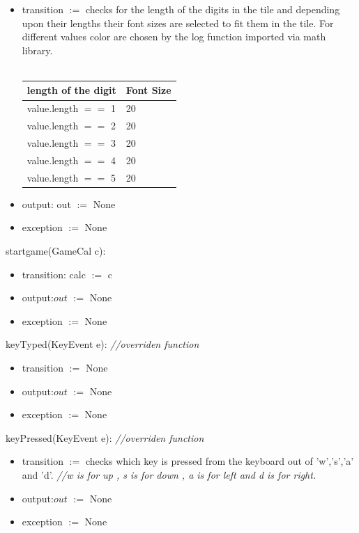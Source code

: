 \documentclass[12pt]{article}
\begin{document}
\begin{itemize}
  \item transition $:=$ checks for the length of the digits in the tile and depending upon their lengths their font sizes are selected to fit them in the tile. For different values color are chosen by the log function imported via math library.\\\\
  \medskip
  \begin{tabular}{| l | l |}
  \hline
  \textbf{length of the digit} & Font Size \\
  \hline
  value.length $==$ 1 &  20 \\
  \hline
  value.length $==$ 2 &  20 \\
  \hline
  value.length $==$ 3 & 20 \\
  \hline
  value.length $==$ 4 & 20 \\
  \hline
  value.length $==$ 5 & 20 \\
  \hline
  \end{tabular}
    \item output: out $:=$ None
  \item exception $:=$ None
\end{itemize}

\noindent startgame(GameCal c):
\begin{itemize}
\item transition: calc $:=$ c
  \item output:$out$ $:=$ None
  \item exception $:=$ None
\end{itemize}

\noindent keyTyped(KeyEvent e): \textit{//overriden function}

\begin{itemize}
\item transition $:=$ None
  \item output:$out$ $:=$ None
  \item exception $:=$ None
\end{itemize}

\noindent keyPressed(KeyEvent e): \textit{//overriden function}

\begin{itemize}
\item transition $:=$ checks which key is pressed from the keyboard out of 'w','s','a' and 'd'. \textit{//w is for up , s is for down , a is for left and d is for right.}
  \item output:$out$ $:=$ None
  \item exception $:=$ None
\end{itemize}
\end{document}

